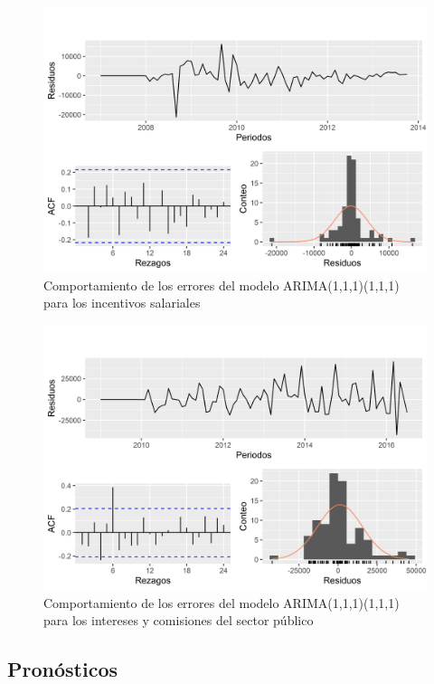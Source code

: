 \documentclass[
]{article}
\begin{document}
\begin{figure}[H]
\includegraphics[width=1\linewidth,height=1\textheight]{Tesis_files/figure-latex/errores_reales_arima_estandar3-1} \caption{Comportamiento de los errores del modelo ARIMA(1,1,1)(1,1,1) para los incentivos salariales}\label{fig:errores_reales_arima_estandar3}
\end{figure}

\begin{figure}[H]
\includegraphics[width=1\linewidth,height=1\textheight]{Tesis_files/figure-latex/errores_reales_arima_estandar4-1} \caption{Comportamiento de los errores del modelo ARIMA(1,1,1)(1,1,1) para los intereses y comisiones del sector público}\label{fig:errores_reales_arima_estandar4}
\end{figure}

\subsection{Pronósticos}
\end{document}
